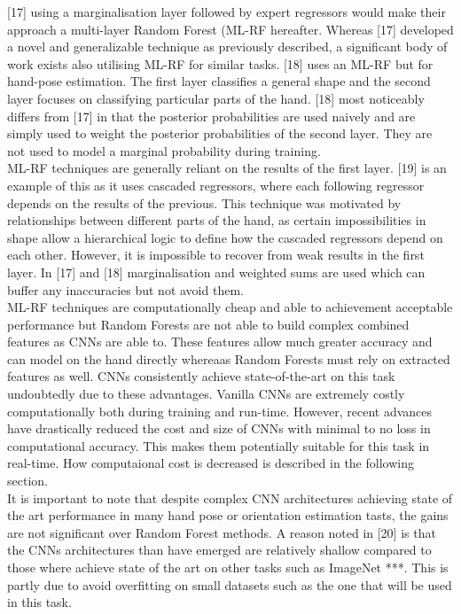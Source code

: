 \documentclass{article}
\begin{document}
[17] using a marginalisation layer followed by expert regressors would make their approach a multi-layer Random Forest (ML-RF hereafter. Whereas [17] developed a novel and generalizable technique as previously described, a significant body of work exists also utilising ML-RF for similar tasks. [18] uses an ML-RF but for hand-pose estimation. The first layer classifies a general shape and the second layer focuses on classifying particular parts of the hand. [18] most noticeably differs from [17] in that the posterior probabilities are used naively and are simply used to weight the posterior probabilities of the second layer. They are not used to model a marginal probability during training. \\

ML-RF techniques are generally reliant on the results of the first layer. [19] is an example of this as it uses cascaded regressors, where each following regressor depends on the results of the previous. This technique was motivated by relationships between different parts of the hand, as certain impossibilities in shape allow a hierarchical logic to define how the cascaded regressors depend on each other. However, it is impossible to recover from weak results in the first layer. In [17] and [18] marginalisation and weighted sums are used which can buffer any inaccuracies but not avoid them. \\

ML-RF techniques are computationally cheap and able to achievement acceptable performance but Random Forests are not able to build complex combined features as CNNs are able to. These features allow much greater accuracy and can model on the hand directly whereaas Random Forests must rely on extracted features as well. CNNs consistently achieve state-of-the-art on this task undoubtedly due to these advantages. Vanilla CNNs are extremely costly computationally both during training and run-time. However, recent advances have drastically reduced the cost and size of CNNs with minimal to no loss in computational accuracy. This makes them potentially suitable for this task in real-time. How computaional cost is decreased is described in the following section. \\

It is important to note that despite complex CNN architectures achieving state of the art performance in many hand pose or orientation estimation tasts, the gains are not significant over Random Forest methods. A reason noted in [20] is that the CNNs architectures than have emerged are relatively shallow compared to those where achieve state of the art on other tasks such as ImageNet ***. This is partly due to avoid overfitting on small datasets such as the one that will be used in this task. \\
\end{document}
